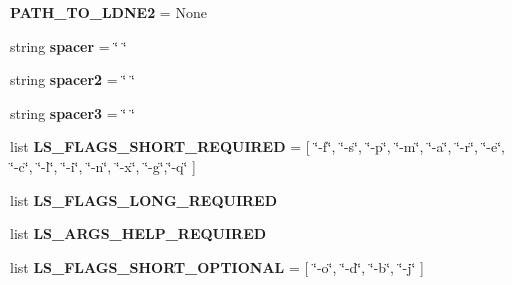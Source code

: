 \begin{DoxyCompactItemize}
\item 
{\bfseries P\+A\+T\+H\+\_\+\+T\+O\+\_\+\+L\+D\+N\+E2} = None\hypertarget{namespacenegui_1_1pgdriveneestimator_af9d9edfba4ccb35868fcc92a0121ff77}{}\label{namespacenegui_1_1pgdriveneestimator_af9d9edfba4ccb35868fcc92a0121ff77}

\item 
string {\bfseries spacer} = \char`\"{} \char`\"{}\hypertarget{namespacenegui_1_1pgdriveneestimator_a783795e063ad4c9d423fdb51c16ef2d2}{}\label{namespacenegui_1_1pgdriveneestimator_a783795e063ad4c9d423fdb51c16ef2d2}

\item 
string {\bfseries spacer2} = \char`\"{} \char`\"{}\hypertarget{namespacenegui_1_1pgdriveneestimator_a67dd1eeed8a1a30f704b56250ccce873}{}\label{namespacenegui_1_1pgdriveneestimator_a67dd1eeed8a1a30f704b56250ccce873}

\item 
string {\bfseries spacer3} = \char`\"{} \char`\"{}\hypertarget{namespacenegui_1_1pgdriveneestimator_aea4fce536a2ded454b3545a03bf9ea69}{}\label{namespacenegui_1_1pgdriveneestimator_aea4fce536a2ded454b3545a03bf9ea69}

\item 
list {\bfseries L\+S\+\_\+\+F\+L\+A\+G\+S\+\_\+\+S\+H\+O\+R\+T\+\_\+\+R\+E\+Q\+U\+I\+R\+ED} = \mbox{[} \char`\"{}-\/f\char`\"{}, \char`\"{}-\/s\char`\"{}, \char`\"{}-\/p\char`\"{}, \char`\"{}-\/m\char`\"{}, \char`\"{}-\/a\char`\"{}, \char`\"{}-\/r\char`\"{}, \char`\"{}-\/e\char`\"{}, \char`\"{}-\/c\char`\"{}, \char`\"{}-\/l\char`\"{}, \char`\"{}-\/i\char`\"{}, \char`\"{}-\/n\char`\"{}, \char`\"{}-\/x\char`\"{}, \char`\"{}-\/g\char`\"{},\char`\"{}-\/q\char`\"{} \mbox{]}\hypertarget{namespacenegui_1_1pgdriveneestimator_aae439ccd49f1eb54994fba6301243d0c}{}\label{namespacenegui_1_1pgdriveneestimator_aae439ccd49f1eb54994fba6301243d0c}

\item 
list {\bfseries L\+S\+\_\+\+F\+L\+A\+G\+S\+\_\+\+L\+O\+N\+G\+\_\+\+R\+E\+Q\+U\+I\+R\+ED}
\item 
list {\bfseries L\+S\+\_\+\+A\+R\+G\+S\+\_\+\+H\+E\+L\+P\+\_\+\+R\+E\+Q\+U\+I\+R\+ED}\hypertarget{namespacenegui_1_1pgdriveneestimator_a724a8227b1b9d47cf4cc6079615ac6f2}{}\label{namespacenegui_1_1pgdriveneestimator_a724a8227b1b9d47cf4cc6079615ac6f2}

\item 
list {\bfseries L\+S\+\_\+\+F\+L\+A\+G\+S\+\_\+\+S\+H\+O\+R\+T\+\_\+\+O\+P\+T\+I\+O\+N\+AL} = \mbox{[} \char`\"{}-\/o\char`\"{}, \char`\"{}-\/d\char`\"{}, \char`\"{}-\/b\char`\"{}, \char`\"{}-\/j\char`\"{} \mbox{]}\hypertarget{namespacenegui_1_1pgdriveneestimator_a8adf3309d69b960bd35c1516501e5b71}{}\label{namespacenegui_1_1pgdriveneestimator_a8adf3309d69b960bd35c1516501e5b71}


\end{DoxyCompactItemize}
